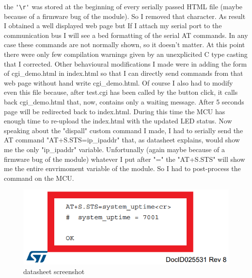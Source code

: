 \documentclass[peerreview]{IEEEtran}
\begin{document}
the \lstinline[style=CStyle]{'\r'} was stored at the beginning of every serially passed HTML file (maybe because of a firmware bug of the module). So I removed that character. As result I obtained a well displayed web page but If I attach my serial port to the communication bus I will see a bed formatting of the serial AT commands. In any case these commands are not normally shown, so it doesn't matter. At this point there were only few compilation warnings given by an unexplicited C type casting that I corrected. Other behavioural modifications I made were in adding the form of cgi\_demo.html in index.html so that I can directly send commands from that web page without hand write cgi\_demo.html. Of course I also had to modify even this file because, after test.cgi has been called by the button click, it calls back cgi\_demo.html that, now, contains only a waiting message. After 5 seconds page will be redirected back to index.html. During this time the MCU has enough time to re-upload the index.html with the updated LED status. Now speaking about the "dispall" custom command I made, I had to serially send the AT command "AT+S.STS=ip\_ipaddr" that, as datasheet explains, would show me the only "ip\_ipaddr" variable. Unfortunally (again maybe because of a firmware bug of the module) whatever I put after "=" the "AT+S.STS" will show me the entire envrimoment variable of the module. So I had to post-process the command on the MCU.
\begin{figure}[!h]
\centering
\includegraphics[width=0.6\columnwidth]{6} 
\caption{datasheet screenshot}
\label{fig_datasheet}
\end{figure}
\end{document}
